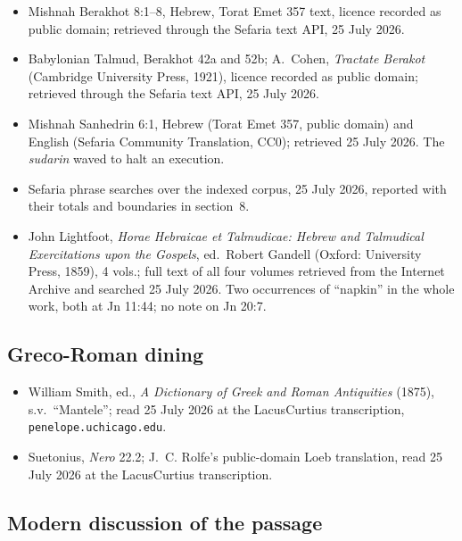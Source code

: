 {\fontsize{8.6}{9.6}\selectfont
\begin{itemize}[itemsep=0pt,parsep=0pt,topsep=0.05em]
\item Mishnah Berakhot 8:1--8, Hebrew, Torat Emet 357 text, licence recorded as
public domain; retrieved through the Sefaria text API, 25 July 2026.
\item Babylonian Talmud, Berakhot 42a and 52b; A.~Cohen, \emph{Tractate
Berakot} (Cambridge University Press, 1921), licence recorded as public domain;
retrieved through the Sefaria text API, 25 July 2026.
\item Mishnah Sanhedrin 6:1, Hebrew (Torat Emet 357, public domain) and English
(Sefaria Community Translation, CC0); retrieved 25 July 2026. The
\emph{sudarin} waved to halt an execution.
\item Sefaria phrase searches over the indexed corpus, 25 July 2026, reported
with their totals and boundaries in section~8.
\item John Lightfoot, \emph{Horae Hebraicae et Talmudicae: Hebrew and Talmudical
Exercitations upon the Gospels}, ed.\ Robert Gandell (Oxford: University Press,
1859), 4 vols.; full text of all four volumes retrieved from the Internet
Archive and searched 25 July 2026. Two occurrences of ``napkin'' in the whole
work, both at Jn 11:44; no note on Jn 20:7.
\end{itemize}}

\subsection*{Greco-Roman dining}

{\fontsize{8.6}{9.6}\selectfont
\begin{itemize}[itemsep=0pt,parsep=0pt,topsep=0.05em]
\item William Smith, ed., \emph{A Dictionary of Greek and Roman Antiquities}
(1875), s.v.\ ``Mantele''; read 25 July 2026 at the LacusCurtius transcription,
\texttt{penelope.uchicago.edu}.
\item Suetonius, \emph{Nero} 22.2; J.~C. Rolfe's public-domain Loeb
translation, read 25 July 2026 at the LacusCurtius transcription.
\end{itemize}}

\subsection*{Modern discussion of the passage}

